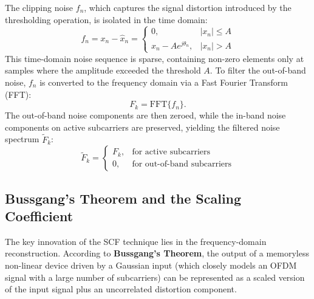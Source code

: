 The clipping noise $f_n$, which captures the signal distortion introduced by the thresholding operation, is isolated in the time domain:
\begin{equation*}
    f_n = x_n - \hat{x}_n = \begin{cases}
        0,                      & |x_n| \le A \\
        x_n - A e^{j \theta_n}, & |x_n| > A
    \end{cases}
\end{equation*}
This time-domain noise sequence is sparse, containing non-zero elements only at samples where the amplitude exceeded the threshold $A$. To filter the out-of-band noise, $f_n$ is converted to the frequency domain via a Fast Fourier Transform (FFT):
\begin{equation*}
    F_k = \mathrm{FFT}\{f_n\}.
\end{equation*}
The out-of-band noise components are then zeroed, while the in-band noise components on active subcarriers are preserved, yielding the filtered noise spectrum $\tilde{F}_k$:
\begin{equation*}
    \tilde{F}_k = \begin{cases}
        F_k, & \text{for active subcarriers}      \\
        0,   & \text{for out-of-band subcarriers}
    \end{cases}
\end{equation*}

\subsection{Bussgang's Theorem and the Scaling Coefficient}

The key innovation of the SCF technique lies in the frequency-domain reconstruction. According to \textbf{Bussgang's Theorem}, the output of a memoryless non-linear device driven by a Gaussian input (which closely models an OFDM signal with a large number of subcarriers) can be represented as a scaled version of the input signal plus an uncorrelated distortion component.


